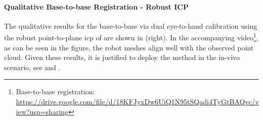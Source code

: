 \paragraph{Qualitative Base-to-base Registration - Robust ICP} The qualitative results for the base-to-base via dual eye-to-hand calibration using the robust point-to-plane \gls{icp} of  are shown in  (right). In the accompanying video\footnote[2]{Base-to-base registration: \url{https://drive.google.com/file/d/18KFJyxDw6UiQ1N95tSQadi4TyGtBAQvc/view?usp=sharing}}, as can be seen in the figure, the robot meshes align well with the observed point cloud. Given these results, it is justified to deploy the method in the in-vivo scenario, see  and .








